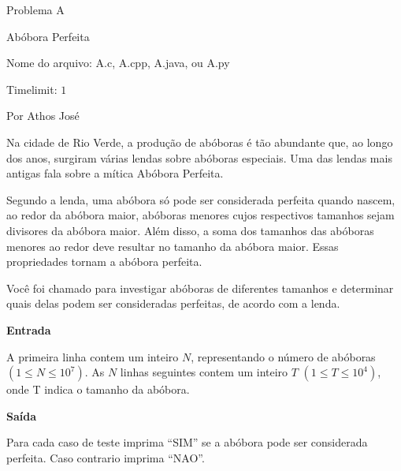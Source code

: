 \begin{center}
Problema A

Abóbora Perfeita

{\small Nome do arquivo: A.c, A.cpp, A.java, ou A.py}

{\large Timelimit: $1$}

{\tiny Por Athos José}

\end{center}

Na cidade de Rio Verde, a produção de abóboras é tão abundante que, ao longo dos anos, surgiram várias lendas sobre abóboras especiais. Uma das lendas mais antigas fala sobre a mítica Abóbora Perfeita.

Segundo a lenda, uma abóbora só pode ser considerada perfeita quando nascem, ao redor da abóbora maior, abóboras menores cujos respectivos tamanhos sejam divisores da abóbora maior. Além disso, a soma dos tamanhos das abóboras menores ao redor deve resultar no tamanho da abóbora maior. Essas propriedades tornam a abóbora perfeita.

Você foi chamado para investigar abóboras de diferentes tamanhos e determinar quais delas podem ser consideradas perfeitas, de acordo com a lenda.

\vspace{0.3cm}
\textbf{Entrada}

A primeira linha contem um inteiro $N$, representando o número de abóboras $(1 \leq N \leq 10^7)$. As $N$ linhas seguintes contem um inteiro $T$ $(1 \leq T \leq 10^4)$, onde T indica o tamanho da abóbora.

\vspace{0.3cm}
\textbf{Saída}

Para cada caso de teste imprima ``SIM'' se a abóbora pode ser considerada perfeita. Caso contrario imprima ``NAO''.


